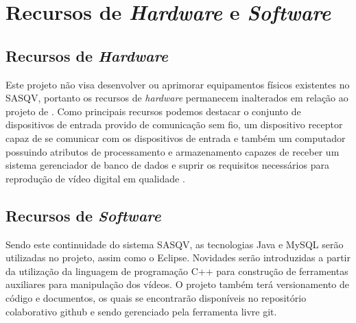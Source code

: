 \chapter{Recursos de \emph{Hardware} e \emph{Software}}

\section{Recursos de \emph{Hardware}}

Este projeto não visa desenvolver ou aprimorar equipamentos físicos existentes no SASQV, portanto os recursos de \emph{hardware} permanecem inalterados em relação ao projeto de \cite{sasqv}. Como principais recursos podemos destacar o conjunto de dispositivos de entrada provido de comunicação sem fio, um dispositivo receptor capaz de se comunicar com os dispositivos de entrada e também um computador possuindo atributos de processamento e armazenamento capazes de receber um sistema gerenciador de banco de dados e suprir os requisitos necessários para reprodução de vídeo digital em qualidade .

\section{Recursos de \emph{Software}}

Sendo este continuidade do sistema SASQV, as tecnologias Java e MySQL serão utilizadas no projeto, assim como o  Eclipse. Novidades serão introduzidas a partir da utilização da linguagem de programação C++ para construção de ferramentas auxiliares para manipulação dos vídeos. O projeto também terá versionamento de código e documentos, os quais se encontrarão disponíveis no repositório colaborativo github \cite{githubabout} e sendo gerenciado pela ferramenta livre git. 
